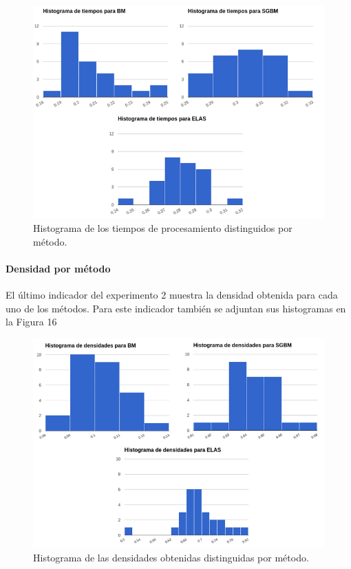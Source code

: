 \documentclass[11pt,a4paper,titlepage]{article}
\newcommand{\Figure}[1]{Figura #1}
\begin{document}
\begin{figure}[h!]

  \centering
    \includegraphics[width=1\textwidth]{f15.png}
  \caption{Histograma de los tiempos de procesamiento distinguidos por método.}
\end{figure}

\paragraph{Densidad por método}
\hfill \break

El último indicador del experimento 2 muestra la densidad obtenida para cada uno de los métodos. Para este indicador también se adjuntan sus histogramas en la \Figure{16}


\begin{figure}[h!]

  \centering
    \includegraphics[width=1\textwidth]{f16.png}
  \caption{Histograma de las densidades obtenidas distinguidas por método.}
\end{figure}
\end{document}
